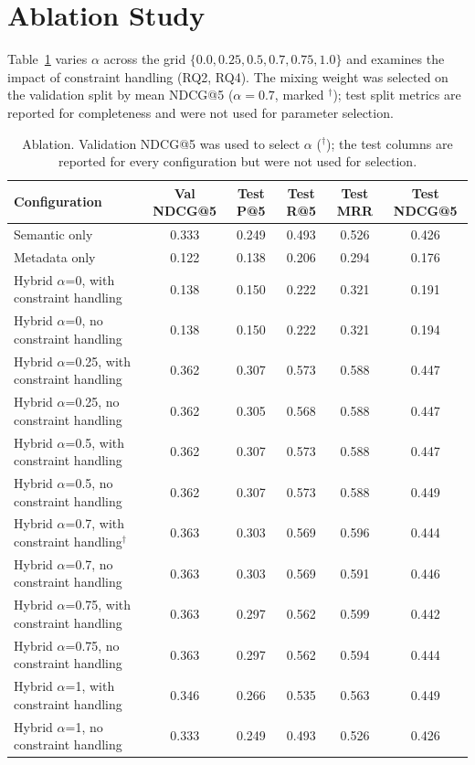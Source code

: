 \documentclass[conference]{IEEEtran}
\begin{document}
\section{Ablation Study}
Table~\ref{tab:ablation} varies $\alpha$ across the grid $\{0.0, 0.25, 0.5, 0.7, 0.75, 1.0\}$ and examines the impact of constraint handling (RQ2, RQ4). The mixing weight was selected on the validation split by mean NDCG@5 ($\alpha=0.7$, marked $^\dagger$); test split metrics are reported for completeness and were not used for parameter selection.

\begin{table}[t]
\centering
\caption{Ablation. Validation NDCG@5 was used to select $\alpha$ ($^\dagger$); the test columns are reported for every configuration but were not used for selection.}
\label{tab:ablation}
\scriptsize
\begin{tabular}{lccccc}
\toprule
Configuration & Val NDCG@5 & Test P@5 & Test R@5 & Test MRR & Test NDCG@5 \\
\midrule
Semantic only & 0.333 & 0.249 & 0.493 & 0.526 & 0.426 \\
Metadata only & 0.122 & 0.138 & 0.206 & 0.294 & 0.176 \\
Hybrid $\alpha$=0, with constraint handling & 0.138 & 0.150 & 0.222 & 0.321 & 0.191 \\
Hybrid $\alpha$=0, no constraint handling & 0.138 & 0.150 & 0.222 & 0.321 & 0.194 \\
Hybrid $\alpha$=0.25, with constraint handling & 0.362 & 0.307 & 0.573 & 0.588 & 0.447 \\
Hybrid $\alpha$=0.25, no constraint handling & 0.362 & 0.305 & 0.568 & 0.588 & 0.447 \\
Hybrid $\alpha$=0.5, with constraint handling & 0.362 & 0.307 & 0.573 & 0.588 & 0.447 \\
Hybrid $\alpha$=0.5, no constraint handling & 0.362 & 0.307 & 0.573 & 0.588 & 0.449 \\
Hybrid $\alpha$=0.7, with constraint handling$^\dagger$ & 0.363 & 0.303 & 0.569 & 0.596 & 0.444 \\
Hybrid $\alpha$=0.7, no constraint handling & 0.363 & 0.303 & 0.569 & 0.591 & 0.446 \\
Hybrid $\alpha$=0.75, with constraint handling & 0.363 & 0.297 & 0.562 & 0.599 & 0.442 \\
Hybrid $\alpha$=0.75, no constraint handling & 0.363 & 0.297 & 0.562 & 0.594 & 0.444 \\
Hybrid $\alpha$=1, with constraint handling & 0.346 & 0.266 & 0.535 & 0.563 & 0.449 \\
Hybrid $\alpha$=1, no constraint handling & 0.333 & 0.249 & 0.493 & 0.526 & 0.426 \\
\bottomrule
\end{tabular}
\end{table}
\end{document}
